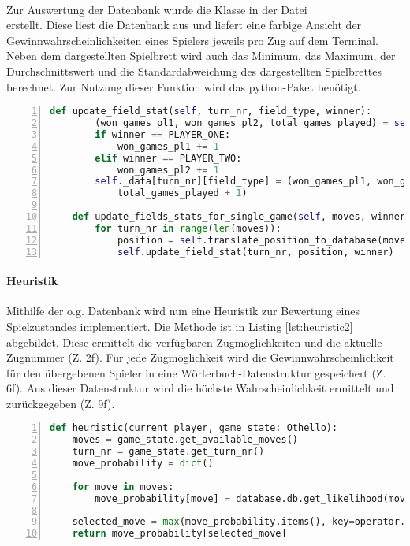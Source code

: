 \\Zur Auswertung der Datenbank wurde die Klasse  in der Datei \\ erstellt. Diese liest die Datenbank aus und liefert eine farbige Ansicht der Gewinnwahrscheinlichkeiten eines Spielers jeweils pro Zug auf dem Terminal. Neben dem dargestellten Spielbrett wird auch das Minimum, das Maximum, der Durchschnittswert und die Standardabweichung des dargestellten Spielbrettes berechnet. Zur Nutzung dieser Funktion wird das python-Paket  benötigt.
\newpage
\begin{lstlisting}[basicstyle=\footnotesize, caption = {Befüllen der Datenbank 2}, language = python, captionpos = t , numbers=left, label={lst:train2}]
	def update_field_stat(self, turn_nr, field_type, winner):
		(won_games_pl1, won_games_pl2, total_games_played) = self._data[turn_nr][field_type]
		if winner == PLAYER_ONE:
			won_games_pl1 += 1
		elif winner == PLAYER_TWO:
			won_games_pl2 += 1
		self._data[turn_nr][field_type] = (won_games_pl1, won_games_pl2, 
			total_games_played + 1)

	def update_fields_stats_for_single_game(self, moves, winner):
		for turn_nr in range(len(moves)):
			position = self.translate_position_to_database(moves[turn_nr])
			self.update_field_stat(turn_nr, position, winner)
\end{lstlisting}

\paragraph{Heuristik}
\label{para:heuristic1}
Mithilfe der o.g. Datenbank wird  nun eine Heuristik zur Bewertung eines Spielzustandes implementiert. Die Methode  ist in Listing \ref{lst:heuristic2} abgebildet. Diese ermittelt die verfügbaren Zugmöglichkeiten und die aktuelle Zugnummer (Z. 2f). Für jede Zugmöglichkeit wird die Gewinnwahrscheinlichkeit für den übergebenen Spieler in eine Wörterbuch-Datenstruktur gespeichert (Z. 6f). Aus dieser Datenstruktur wird die höchste Wahrscheinlichkeit ermittelt und zurückgegeben (Z. 9f).
\begin{lstlisting}[basicstyle=\footnotesize, caption = {Stored Monte-Carlo-Heuristik Funktion}, language = python, captionpos = t , numbers=left, label={lst:heuristic2}]
def heuristic(current_player, game_state: Othello):
	moves = game_state.get_available_moves()
	turn_nr = game_state.get_turn_nr()
	move_probability = dict()

	for move in moves:
		move_probability[move] = database.db.get_likelihood(move, turn_nr, current_player)

	selected_move = max(move_probability.items(), key=operator.itemgetter(1))[0]
 	return move_probability[selected_move]
\end{lstlisting}

